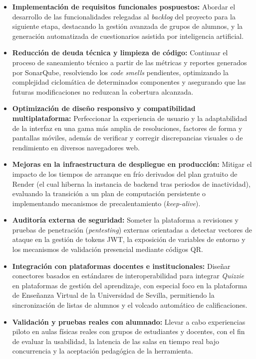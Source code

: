 \begin{itemize}
    \item \textbf{Implementación de requisitos funcionales pospuestos:} Abordar el desarrollo de las funcionalidades relegadas al \textit{backlog} del proyecto para la siguiente etapa, destacando la gestión avanzada de grupos de alumnos, y la generación automatizada de cuestionarios asistida por inteligencia artificial.
    \item \textbf{Reducción de deuda técnica y limpieza de código:} Continuar el proceso de saneamiento técnico a partir de las métricas y reportes generados por SonarQube, resolviendo los \textit{code smells} pendientes, optimizando la complejidad ciclomática de determinados componentes y asegurando que las futuras modificaciones no reduzcan la cobertura alcanzada.
    \item \textbf{Optimización de diseño responsivo y compatibilidad multiplataforma:} Perfeccionar la experiencia de usuario y la adaptabilidad de la interfaz en una gama más amplia de resoluciones, factores de forma y pantallas móviles, además de verificar y corregir discrepancias visuales o de rendimiento en diversos navegadores web.
    \item \textbf{Mejoras en la infraestructura de despliegue en producción:} Mitigar el impacto de los tiempos de arranque en frío derivados del plan gratuito de Render (el cual hiberna la instancia de backend tras periodos de inactividad), evaluando la transición a un plan de computación persistente o implementando mecanismos de precalentamiento (\textit{keep-alive}).
    \item \textbf{Auditoría externa de seguridad:} Someter la plataforma a revisiones y pruebas de penetración (\textit{pentesting}) externas orientadas a detectar vectores de ataque en la gestión de tokens JWT, la exposición de variables de entorno y los mecanismos de validación presencial mediante códigos QR.
    \item \textbf{Integración con plataformas docentes e institucionales:} Diseñar conectores basados en estándares de interoperabilidad para integrar \textit{Quizzie} en plataformas de gestión del aprendizaje, con especial foco en la plataforma de Enseñanza Virtual de la Universidad de Sevilla, permitiendo la sincronización de listas de alumnos y el volcado automático de calificaciones.
    \item \textbf{Validación y pruebas reales con alumnado:} Llevar a cabo experiencias piloto en aulas físicas reales con grupos de estudiantes y docentes, con el fin de evaluar la usabilidad, la latencia de las salas en tiempo real bajo concurrencia y la aceptación pedagógica de la herramienta.
\end{itemize}